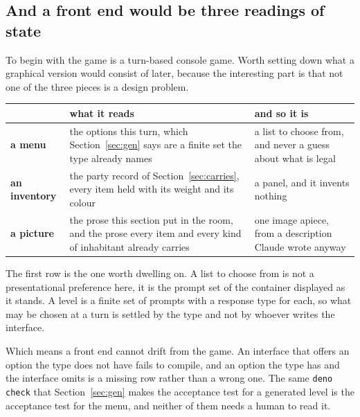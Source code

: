 \documentclass[11pt,a4paper]{article}
\begin{document}
\subsection{And a front end would be three readings of state}
\label{sec:gui}

To begin with the game is a turn-based console game. Worth setting down what a graphical version
would consist of later, because the interesting part is that not one of the three pieces is a
design problem.

\begin{center}
\begin{tabular}{@{}l@{\hspace{4mm}}>{\raggedright\arraybackslash}p{}@{\hspace{4mm}}>{\raggedright\arraybackslash}p{}@{}}
\toprule
& \textbf{what it reads} & \textbf{and so it is} \\
\midrule
\textbf{a menu} & the options this turn, which Section~\ref{sec:gen} says are a finite set the type
already names & a list to choose from, and never a guess about what is legal \\[1mm]
\textbf{an inventory} & the party record of Section~\ref{sec:carries}, every item held with its
weight and its colour & a panel, and it invents nothing \\[1mm]
\textbf{a picture} & the prose this section put in the room, and the prose every item and every
kind of inhabitant already carries & one image apiece, from a description Claude wrote anyway \\
\bottomrule
\end{tabular}
\end{center}

The first row is the one worth dwelling on. A list to choose from is not a presentational
preference here, it is the prompt set of the container displayed as it stands. A level is a finite
set of prompts with a response type for each, so what may be chosen at a turn is settled by the
type and not by whoever writes the interface.

\begin{sectionbox}
Which means a front end cannot drift from the game. An interface that offers an option the type
does not have fails to compile, and an option the type has and the interface omits is a missing
row rather than a wrong one. The same \texttt{deno check} that Section~\ref{sec:gen} makes the
acceptance test for a generated level is the acceptance test for the menu, and neither of them
needs a human to read it.
\end{sectionbox}
\end{document}
